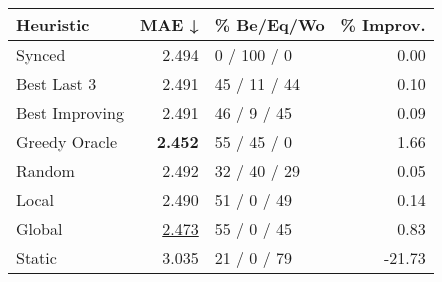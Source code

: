 \begin{tabular}{lrlr}
\toprule
\textbf{Heuristic} & \textbf{MAE ↓} & \textbf{\% Be/Eq/Wo} & \textbf{\% Improv.} \\
\midrule
            Synced &          2.494 &          0 / 100 / 0 &                0.00 \\
\midrule
       Best Last 3 &          2.491 &         45 / 11 / 44 &                0.10 \\
    Best Improving &          2.491 &          46 / 9 / 45 &                0.09 \\
\addlinespace
     Greedy Oracle &          \textbf{2.452} &          55 / 45 / 0 &                1.66 \\
            Random &          2.492 &         32 / 40 / 29 &                0.05 \\
\midrule
             Local &          2.490 &          51 / 0 / 49 &                0.14 \\
            Global &          \underline{2.473} &          55 / 0 / 45 &                0.83 \\
\midrule
            Static &          3.035 &          21 / 0 / 79 &              -21.73 \\
\bottomrule
\end{tabular}

\label{tab:hr_iid_lr01_le1_bs2_Summary}
